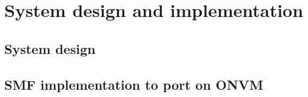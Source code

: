 \chapter{System design and implementation}
\label{chapter:system}

\section{System design}
\label{subsec:system}

\section{SMF implementation to port on ONVM}
\label{subsec:system}
